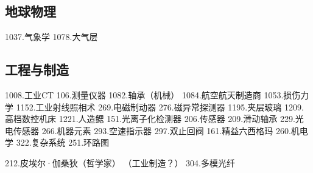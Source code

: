 \subsection{地球物理}
1037.气象学
1078.大气层

\subsection{工程与制造}
1008.工业CT
106.测量仪器
1082.轴承（机械）
1084.航空航天制造商
1053.损伤力学
1152.工业射线照相术
269.电磁制动器
276.磁异常探测器
1195.夹层玻璃
1209.高档数控机床
1221.人造鳃
151.光离子化检测器
206.传感器
209.滑动轴承
229.光电传感器
266.机器元素
293.空速指示器
297.双止回阀
161.精益六西格玛
260.机电学
322.复杂系统
251.环路图

212.皮埃尔·伽桑狄（哲学家）	    
 （工业制造？）    304.多模光纤
